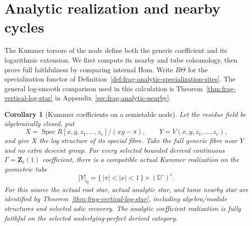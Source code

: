 \documentclass[11pt]{article}
\newtheorem{corollary}[theorem]{Corollary}
\theoremstyle{definition}
\theoremstyle{remark}
\begin{document}
\section{Analytic realization and nearby cycles}
\label{sec:local-analytic-realization}

The Kummer torsors of the node define both the generic coefficient
and its logarithmic extension.  We first compute its nearby and tube
cohomology, then prove full faithfulness by comparing internal Hom.
Write $R\Theta$ for the specialization functor of
Definition~\ref{def:frag-analytic-specialization-sites}.
The general log-smooth comparison used in this calculation is
Theorem~\ref{thm:frag-vertical-log-star} in
Appendix~\ref{sec:frag-analytic-nearby}.

\begin{corollary}[Kummer coefficients on a semistable node]
\label{cor:frag-node-full-Kummer-star}
Let the residue field be algebraically closed, put
\[
 X=\operatorname{Spec}R[x,y,z_1,\ldots,z_e]/(xy-\pi),\qquad
 Y=V(x,y,z_1,\ldots,z_e),
\]
and give $X$ the log structure of its special fibre.  Take the full
generic fibre near $Y$ and no extra descent group.  For every selected
bounded derived continuous $\Gamma=\mathbf Z_\ell(1)$ coefficient,
there is a compatible actual Kummer realization on the geometric tube
\[
 ]Y[_{\bar\eta}=\{\,|\pi|<|x|<1\,\}\times(\mathbb D^\circ)^e.
\]
For this source the actual root star, actual analytic star, and tame
nearby star are identified by Theorem~\ref{thm:frag-vertical-log-star},
including algebra/module structures and selected adic recovery.  The
analytic coefficient realization is fully faithful on the selected
underlying-perfect derived category.
\end{corollary}
\end{document}
